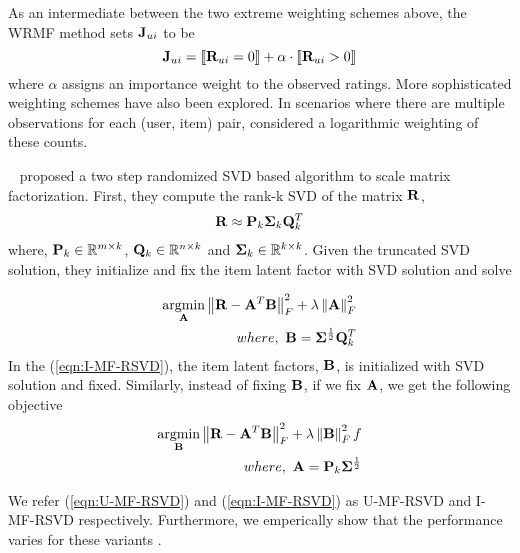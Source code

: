 %

As an intermediate between the two extreme weighting schemes above, the WRMF method \citep{Pan:2008} sets $\J_{\ui}$ to be
\begin{equation}
\label{eqn:wrmf-weight}
\J_{\ui} =  \indicator{ \R_{\ui} = 0 } + \alpha \cdot \indicator{ \R_{\ui} > 0 } 
\end{equation}
where $\alpha$ assigns an importance weight to the observed ratings. 
More sophisticated weighting schemes have also been explored.
In scenarios where there are multiple observations for each (user, item) pair, \citet{Hu:2008} considered a logarithmic weighting of these counts.

~\citep{Tang:2013} proposed a two step randomized SVD based algorithm to scale matrix factorization. First, they compute the rank-k SVD of the matrix $\R$,
\begin{align*}
	\R \approx \P_k \Sig_k \Q^T_k
\end{align*}
where, $\P_k \in \mathbb{R}^{m \times k}$, $\Q_k \in \mathbb{R}^{n \times k}$ and $\Sig_k \in \mathbb{R}^{k \times k}$. Given the truncated SVD solution, they initialize and fix the item latent factor with SVD solution and solve 

\begin{align}
\label{eqn:I-MF-RSVD}
\begin{split}
\underset{\A}{\mathrm{argmin}}  \left \| \R - \A^T\B\right \|_F^2 + \lambda \left \|  \A \right \|_F^2   \\
where,\ \B = \Sig^{\frac{1}{2}} \Q^T_k 
\end{split}
\end{align}
In the (\ref{eqn:I-MF-RSVD}), the item latent factors, $\B$, is initialized with SVD solution and fixed. Similarly, instead of fixing $\B$, if we fix $\A$, we get the following objective  
\begin{align}
\label{eqn:U-MF-RSVD}
\begin{split}
\underset{\B}{\mathrm{argmin}}  \left \| \R - \A^T\B\right \|_F^2 + \lambda \left \|  \B \right \|_F^2 f\\
where,\ \A = \P_k \Sig^{\frac{1}{2}}\\
\end{split}
\end{align}

We refer (\ref{eqn:U-MF-RSVD}) and (\ref{eqn:I-MF-RSVD}) as U-MF-RSVD and I-MF-RSVD respectively. Furthermore, we emperically show that the performance varies for these variants .
